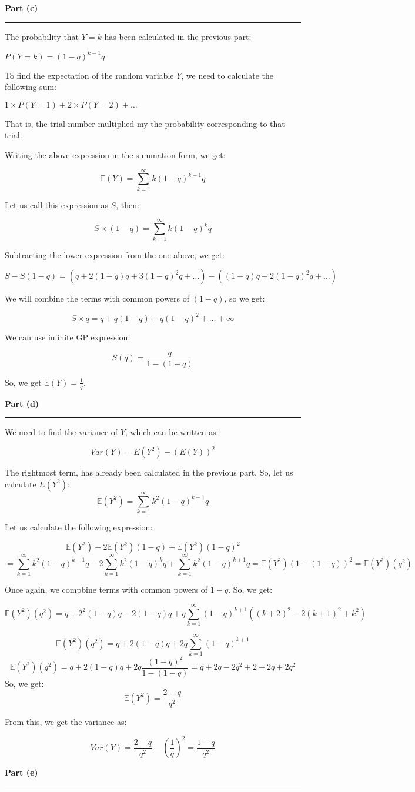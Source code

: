 \documentclass[a4paper,12pt]{article}
\newenvironment{solution}[2][]{%
    \begin{mdframed}[linecolor=blue!70!black, linewidth=2pt, roundcorner=10pt, backgroundcolor=yellow!10!white, skipabove=12pt, skipbelow=12pt]%
        \textbf{\large #2}
        \par\noindent\rule{\textwidth}{0.4pt}
}{
    \end{mdframed}
}
\begin{document}
\begin{solution}{Part (c)}
  The probability that $Y = k$ has been calculated in the previous part:

  $P(Y = k) = (1-q)^{k-1}q$

  To find the expectation of the random variable $Y$, we need to calculate the following sum:

  $1\times P(Y = 1) + 2\times P(Y = 2) + \dots$

  That is, the trial number multiplied my the probability corresponding to that trial.


  Writing the above expression in the summation form, we get:

  \[\mathbb{E}(Y) = \sum_{k=1}^{\infty}k(1-q)^{k-1}q\]

  Let us call this expression as $S$, then:

  \[S\times(1-q) = \sum_{k=1}^{\infty}k(1-q)^{k}q\]

  Subtracting the lower expression from the one above, we get:

  \[S - S(1-q) = (q + 2(1-q)q + 3(1-q)^2q + \dots) - ((1-q)q + 2(1-q)^2q + \dots)\]

  We will combine the terms with common powers of $(1-q)$, so we get:

  \[S\times q = q + q(1-q) + q(1-q)^2 + \dots + \infty\]

  We can use infinite GP expression:

  \[S(q) = \frac{q}{1-(1-q)}\]

  So, we get $\mathbb{E}(Y) = \frac{1}{q}$.
\end{solution}

\begin{solution}{Part (d)}
  We need to find the variance of $Y$, which can be written as:

  \[Var(Y) = E(Y^2) - (E(Y))^2\]

  The rightmost term, has already been calculated in the previous part. So, let us calculate $E(Y^2)$:
  \[\mathbb{E}(Y^2) = \sum_{k=1}^{\infty}k^2(1-q)^{k-1}q\]

  Let us calculate the following expression:

  \[\mathbb{E}(Y^2) - 2\mathbb{E}(Y^2)(1-q) + \mathbb{E}(Y^2)(1-q)^2 \]
  \[= \sum_{k=1}^{\infty}k^2(1-q)^{k-1}q - 2\sum_{k=1}^{\infty}k^2(1-q)^{k}q + \sum_{k=1}^{\infty}k^2(1-q)^{k+1}q = \mathbb{E}(Y^2)(1-(1-q))^2 = \mathbb{E}(Y^2)(q^2)\]

  Once again, we compbine terms with common powers of $1-q$.  So, we get:

  \[\mathbb{E}(Y^2)(q^2) = q + 2^2(1-q)q -  2(1-q)q  + q\sum_{k=1}^{\infty}(1-q)^{k+1}((k+2)^2 - 2(k+1)^2 + k^2)\]

  \[\mathbb{E}(Y^2)(q^2) = q + 2(1-q)q + 2q\sum_{k=1}^{\infty}(1-q)^{k+1}\]
  \[\mathbb{E}(Y^2)(q^2) = q + 2(1-q)q + 2q\frac{(1-q)^2}{1-(1-q)} = q + 2q - 2q^2 + 2-2q + 2q^2\]
  So, we get:
  \[\mathbb{E}(Y^2) = \frac{2-q}{q^2}\]

  From this, we get the variance as:

  \[Var(Y) = \frac{2-q}{q^2} - (\frac{1}{q})^2 = \frac{1-q}{q^2}\]
  
\end{solution}

\begin{solution}{Part (e)}
  
\end{solution}
\end{document}
